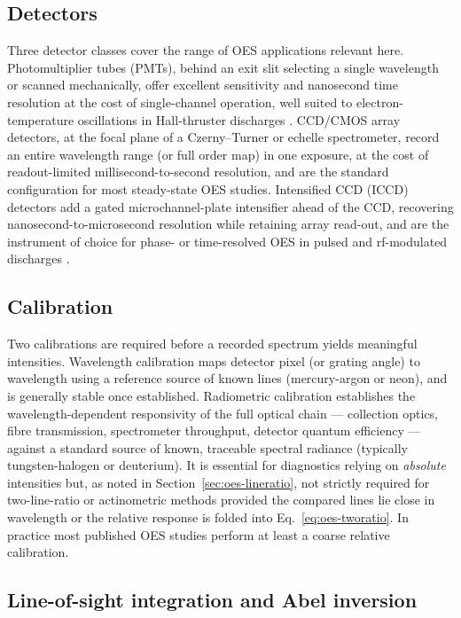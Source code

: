 \subsection{Detectors}

Three detector classes cover the range of OES applications relevant here. Photomultiplier tubes (PMTs), behind an exit slit selecting a single wavelength or scanned mechanically, offer excellent sensitivity and nanosecond time resolution at the cost of single-channel operation, well suited to electron-temperature oscillations in Hall-thruster discharges \cite{ref0256}. CCD/CMOS array detectors, at the focal plane of a Czerny–Turner or echelle spectrometer, record an entire wavelength range (or full order map) in one exposure, at the cost of readout-limited millisecond-to-second resolution, and are the standard configuration for most steady-state OES studies. Intensified CCD (ICCD) detectors add a gated microchannel-plate intensifier ahead of the CCD, recovering nanosecond-to-microsecond resolution while retaining array read-out, and are the instrument of choice for phase- or time-resolved OES in pulsed and rf-modulated discharges \cite{ref0256,ref0257}.

\subsection{Calibration}

Two calibrations are required before a recorded spectrum yields meaningful intensities. Wavelength calibration maps detector pixel (or grating angle) to wavelength using a reference source of known lines (mercury-argon or neon), and is generally stable once established. Radiometric calibration establishes the wavelength-dependent responsivity of the full optical chain — collection optics, fibre transmission, spectrometer throughput, detector quantum efficiency — against a standard source of known, traceable spectral radiance (typically tungsten-halogen or deuterium). It is essential for diagnostics relying on \emph{absolute} intensities but, as noted in Section~\ref{sec:oes-lineratio}, not strictly required for two-line-ratio or actinometric methods provided the compared lines lie close in wavelength or the relative response is folded into Eq.~\eqref{eq:oes-tworatio}. In practice most published OES studies perform at least a coarse relative calibration.

\subsection{Line-of-sight integration and Abel inversion}

